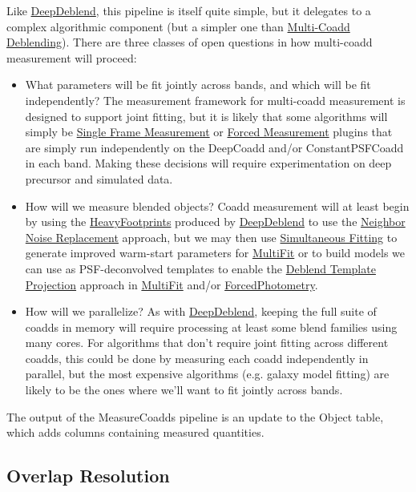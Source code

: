 Like \hyperref[sec:drpDeepDeblend]{DeepDeblend}, this pipeline is itself quite simple, but it delegates to a complex algorithmic component (but a simpler one than \hyperref[sec:acMultiCoaddDeblending]{Multi-Coadd Deblending}).  There are three classes of open questions in how multi-coadd measurement will proceed:
\begin{itemize}
\item What parameters will be fit jointly across bands, and which will be fit independently?  The measurement framework for multi-coadd measurement is designed to support joint fitting, but it is likely that some algorithms will simply be \hyperref[sec:acSingleFrameMeasurement]{Single Frame Measurement} or \hyperref[sec:acForcedMeasurement]{Forced Measurement} plugins that are simply run independently on the DeepCoadd and/or ConstantPSFCoadd in each band.  Making these decisions will require experimentation on deep precursor and simulated data.
\item How will we measure blended objects?  Coadd measurement will at least begin by using the \hyperref[sec:spFootprints]{HeavyFootprints} produced by \hyperref[sec:drpDeepDeblend]{DeepDeblend} to use the \hyperref[sec:acReplaceNeighborsWithNoise]{Neighbor Noise Replacement} approach, but we may then use \hyperref[sec:acSimultaneousFitting]{Simultaneous Fitting} to generate improved warm-start parameters for \hyperref[sec:drpMultiFit]{MultiFit} or to build models we can use as PSF-deconvolved templates to enable the \hyperref[sec:acDeblendTemplateProjection]{Deblend Template Projection} approach in \hyperref[sec:drpMultiFit]{MultiFit} and/or \hyperref[sec:drpForcedPhotometry]{ForcedPhotometry}.
\item How will we parallelize?  As with \hyperref[sec:drpDeepDeblend]{DeepDeblend}, keeping the full suite of coadds in memory will require processing at least some blend families using many cores.  For algorithms that don't require joint fitting across different coadds, this could be done by measuring each coadd independently in parallel, but the most expensive algorithms (e.g. galaxy model fitting) are likely to be the ones where we'll want to fit jointly across bands.
\end{itemize}

The output of the MeasureCoadds pipeline is an update to the Object table, which adds columns containing measured quantities.

\subsection{Overlap Resolution}
\label{sec:drp_overlap_resolution}

